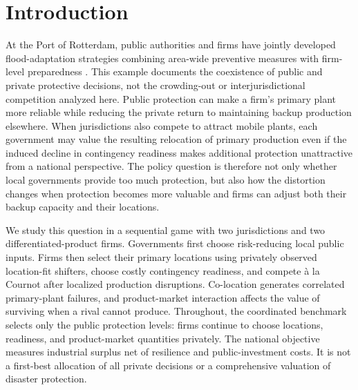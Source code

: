 \section{Introduction}\label{sec:introduction}

At the Port of Rotterdam, public authorities and firms have jointly developed flood-adaptation strategies combining area-wide preventive measures with firm-level preparedness \citep{EEAClimateADAPT2025}. This example documents the coexistence of public and private protective decisions, not the crowding-out or interjurisdictional competition analyzed here. Public protection can make a firm's primary plant more reliable while reducing the private return to maintaining backup production elsewhere. When jurisdictions also compete to attract mobile plants, each government may value the resulting relocation of primary production even if the induced decline in contingency readiness makes additional protection unattractive from a national perspective. The policy question is therefore not only whether local governments provide too much protection, but also how the distortion changes when protection becomes more valuable and firms can adjust both their backup capacity and their locations.

We study this question in a sequential game with two jurisdictions and two differentiated-product firms. Governments first choose risk-reducing local public inputs. Firms then select their primary locations using privately observed location-fit shifters, choose costly contingency readiness, and compete \`a la Cournot after localized production disruptions. Co-location generates correlated primary-plant failures, and product-market interaction affects the value of surviving when a rival cannot produce. Throughout, the coordinated benchmark selects only the public protection levels: firms continue to choose locations, readiness, and product-market quantities privately. The national objective measures industrial surplus net of resilience and public-investment costs. It is not a first-best allocation of all private decisions or a comprehensive valuation of disaster protection.

